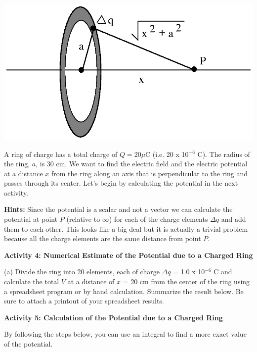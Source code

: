\vspace{0.3cm}
{\centering \includegraphics{electric_potential/electric_potential_fig_5.eps} \par}
\vspace{0.3cm}

\vspace{2in}
A ring of charge has a total charge of $Q = 20$\( \mu  \)C (i.e. 20
x 10\( ^{-6} \) C). The radius of the ring, $a$, is 30 cm. We want
to find the electric field and the electric potential at a distance $x$ from the ring along an axis that is perpendicular to the ring
and passes through its center. Let's begin by calculating the potential
in the next activity.

\textbf{Hints:} Since the potential is a scalar and not a vector we
can calculate the potential at point $P$ (relative to \( \infty  \))
for each of the charge elements \( \Delta q \) and add them to each
other. This looks like a big deal but it is actually a trivial problem
because all the charge elements are the same distance from point $P$.

\textbf{Activity 4: Numerical Estimate of the Potential due to a Charged
Ring}

(a) Divide the ring into 20 elements, each of charge \( \Delta q \) = 1.0 x 10\( ^{-6} \) C and
calculate the total $V$ at a distance of $x$ = 20 cm from the center of
the ring using a spreadsheet program or by hand calculation. Summarize
the result below. Be sure to attach a printout of your spreadsheet
results.
\vspace{1.5in}

\textbf{Activity 5: Calculation of the Potential due to a Charged Ring}

By following the steps below, you can use an integral to find a more
exact value of the potential.

